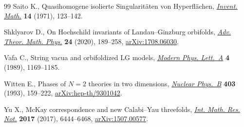 \begin{thebibliography}{99}
Saito K., Quasihomogene isolierte {S}ingularit\"aten von {H}yperfl\"achen,
 \href{https://doi.org/10.1007/BF01405360}{\textit{Invent. Math.}} \textbf{14} (1971), 123--142.

Shklyarov D., On {H}ochschild invariants of {L}andau--{G}inzburg orbifolds,
 \href{https://doi.org/10.4310/ATMP.2020.v24.n1.a6}{\textit{Adv. Theor. Math. Phys.}} \textbf{24} (2020), 189--258,
 \href{https://arxiv.org/abs/1708.06030}{arXiv:1708.06030}.


Vafa C., String vacua and orbifoldized {LG} models, \href{https://doi.org/10.1142/S0217732389001350}{\textit{Modern Phys.
 Lett.~A}} \textbf{4} (1989), 1169--1185.

Witten E., Phases of {$N=2$} theories in two dimensions, \href{https://doi.org/10.1016/0550-3213(93)90033-L}{\textit{Nuclear
 Phys.~B}} \textbf{403} (1993), 159--222, \href{https://arxiv.org/abs/hep-th/9301042}{arXiv:hep-th/9301042}.

Yu X., Mc{K}ay correspondence and new {C}alabi--{Y}au threefolds, \href{https://doi.org/10.1093/imrn/rnv391}{\textit{Int.
 Math. Res. Not.}} \textbf{2017} (2017), 6444--6468, \href{https://arxiv.org/abs/1507.00577}{arXiv:1507.00577}.

\end{thebibliography}
